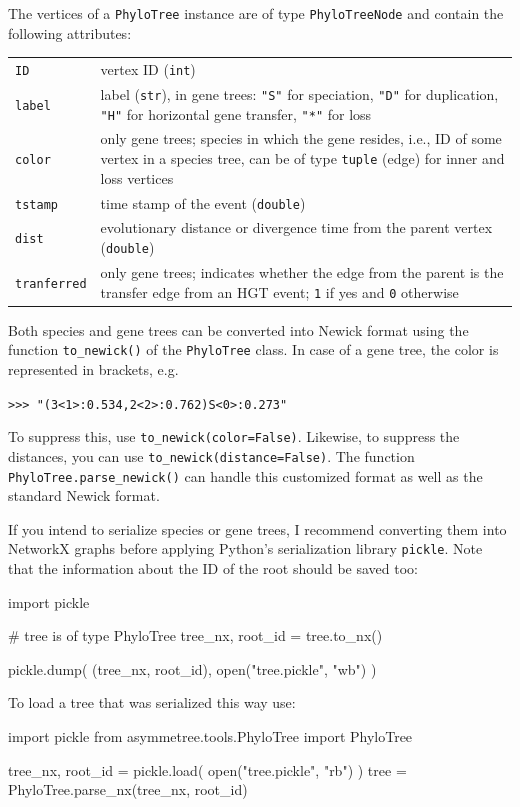 \documentclass[hidelinks,11pt]{scrreprt}
\newcommand{\COMMANDLINE}[1]{\begingroup\par\vspace{3mm}\color{darkgrey}\begin{adjustwidth}{1cm}{1cm}\texttt{#1}\end{adjustwidth}\vspace{3mm}\endgroup}
\begin{document}
The vertices of a \texttt{PhyloTree} instance are of type \texttt{PhyloTreeNode} and contain the following attributes:

\vspace{3mm}
\renewcommand{\arraystretch}{1.5}
\begin{tabularx}{0.95\textwidth} { >{\raggedright\arraybackslash}p{3cm} >{\raggedright\arraybackslash}X }
	\texttt{ID} & vertex ID (\texttt{int})\\
	\texttt{label}  & label (\texttt{str}), in gene trees: \texttt{"S"} for speciation, \texttt{"D"} for duplication, \texttt{"H"} for horizontal gene transfer, \texttt{"*"} for loss\\
	\texttt{color} & only gene trees; species in which the gene resides, i.e., ID of some vertex in a species tree, can be of type \texttt{tuple} (edge) for inner and loss vertices\\
	\texttt{tstamp} & time stamp of the event (\texttt{double})\\
	\texttt{dist} & evolutionary distance or divergence time from the parent vertex (\texttt{double})\\
	\texttt{tranferred} & only gene trees; indicates whether the edge from the parent is the transfer edge from an HGT event; \texttt{1} if yes and \texttt{0} otherwise \\
\end{tabularx}
\vspace{3mm}

Both species and gene trees can be converted into Newick format using the function \texttt{to\_newick()} of the \texttt{PhyloTree} class.
In case of a gene tree, the color is represented in brackets, e.g.
\COMMANDLINE{>>> "(3<1>:0.534,2<2>:0.762)S<0>:0.273"}
To suppress this, use \texttt{to\_newick(color=False)}. Likewise, to suppress the distances, you can use \texttt{to\_newick(distance=False)}.
The function \texttt{PhyloTree.parse\_newick()} can handle this customized format as well as the standard Newick format.

If you intend to serialize species or gene trees, I recommend converting them into NetworkX graphs before applying Python's serialization library \texttt{pickle}.
Note that the information about the ID of the root should be saved too:
\vspace{2mm}
\begin{python}
import pickle

# tree is of type PhyloTree
tree_nx, root_id = tree.to_nx()

pickle.dump( (tree_nx, root_id), open("tree.pickle", "wb") )
\end{python}
\vspace{2mm}
To load a tree that was serialized this way use:
\vspace{2mm}
\begin{python}
import pickle
from asymmetree.tools.PhyloTree import PhyloTree

tree_nx, root_id = pickle.load( open("tree.pickle", "rb") )
tree = PhyloTree.parse_nx(tree_nx, root_id)
\end{python}
\vspace{2mm}
\end{document}
